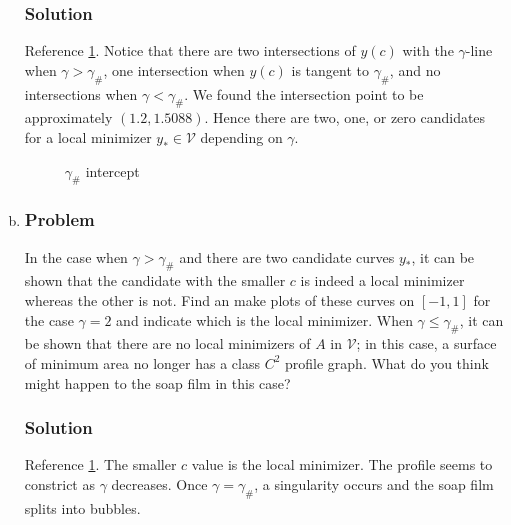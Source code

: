 \documentclass[12pt,twoside]{article}
\begin{document}
\begin{enumerate}[(a)]
\subsubsection*{Solution}
Reference \cref{fig:minilab.c-gamma-intercept}. Notice that there are two
intersections of $y(c)$ with the $\gamma$-line when $\gamma>\gamma_{\#}$, one
intersection when $y(c)$ is tangent to $\gamma_{\#}$, and no intersections when
$\gamma<\gamma_{\#}$. We found the intersection point to be approximately $(1.2,
1.5088)$. Hence there are two, one, or zero candidates for a local minimizer
$y_*\in\mathcal{V}$ depending on $\gamma$.
\begin{figure}
  \centering
  \caption{$\gamma_{\#}$ intercept}
  \label{fig:minilab.c-gamma-intercept}
\end{figure}

\item
\subsubsection*{Problem}
In the case when $\gamma > \gamma_{\#}$ and there are two candidate curves
$y_*$, it can be shown that the candidate with the smaller $c$ is indeed a local
minimizer whereas the other is not. Find an make plots of these curves on
$[-1,1]$ for the case $\gamma=2$ and indicate which is the local minimizer. When
$\gamma\le\gamma_{\#}$, it can be shown that there are no local minimizers of
$A$ in $\mathcal{V}$; in this case, a surface of minimum area no longer has a
class $C^2$ profile graph. What do you think might happen to the soap film in
this case?

\subsubsection*{Solution}
Reference \cref{fig:minilab.c-gamma-intercept}. The smaller $c$ value is the
local minimizer. The profile seems to constrict as $\gamma$ decreases. Once
$\gamma=\gamma_{\#}$, a singularity occurs and the soap film splits into
bubbles.

\end{enumerate}
\end{document}
